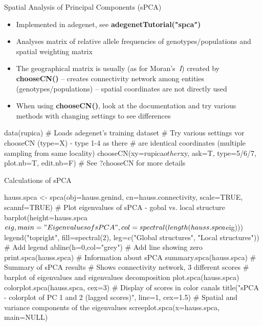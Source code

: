 \documentclass[compress, ucs, xelatex, 11pt, xcolor=svgnames,
  hyperref={
    bookmarks=true,
    unicode=true,
    colorlinks=true,
    pdftitle={Molecular data in R},
    plainpages=false,
    pdfauthor={Vojtech Zeisek},
    pdfsubject={Course about phylogeny and evolution in R},
    pdfcreator={XeLaTeX},
    pdfkeywords={R, evolution, phylogeny, molecular data},
    linkcolor=Tomato,
    anchorcolor=SaddleBrown,
    citecolor=Goldenrod,
    filecolor=DarkMagenta,
    menucolor=Sienna,
    urlcolor=DarkTurquoise,
    pdftex},
  url={hyphens, lowtilde} %
  ]{beamer}
\begin{document}
\begin{frame}[fragile]{Spatial Analysis of Principal Components (sPCA)}
\begin{itemize}
 \item Implemented in adegenet, see \textbf{adegenetTutorial("spca")}
 \item Analyses matrix of relative allele frequencies of genotypes/populations and spatial weighting matrix
 \item The geographical matrix is usually (as for Moran's~\textit{I}) created by \textbf{chooseCN()} -- creates connectivity network among entities (genotypes/populations) -- spatial coordinates are not directly used
 \item When using \textbf{chooseCN()}, look at the documentation and try various methods with changing settings to see differences
\end{itemize}
  \begin{spluscode}
    data(rupica) # Loads adegenet's training dataset
    # Try various settings vor chooseCN (type=X) - type 1-4 as there
    # are identical coordinates (multiple sampling from same locality)
    chooseCN(xy=rupica$other$xy, ask=T, type=5/6/7, plot.nb=T, edit.nb=F)
    # See ?chooseCN for more details
  \end{spluscode}
\end{frame}

\begin{frame}[fragile]{Calculations of sPCA}
  \begin{spluscode}
    hauss.spca <- spca(obj=hauss.genind, cn=hauss.connectivity,
      scale=TRUE, scannf=TRUE)
    # Plot eigenvalues of sPCA - gobal vs. local structure
    barplot(height=hauss.spca$eig, main="Eigenvalues of sPCA",
      col=spectral(length(hauss.spca$eig)))
    legend("topright", fill=spectral(2), leg=c("Global structures",
      "Local structures")) # Add legend
    abline(h=0,col="grey") # Add line showing zero
    print.spca(hauss.spca) # Information about sPCA
    summary.spca(hauss.spca) # Summary of sPCA results
    # Shows connectivity network, 3 different scores
    # barplot of eigenvalues and eigenvalues decomposition
    plot.spca(hauss.spca)
    colorplot.spca(hauss.spca, cex=3) # Display of scores in color canals
    title("sPCA - colorplot of PC 1 and 2 (lagged scores)", line=1, cex=1.5)
    # Spatial and variance components of the eigenvalues
    screeplot.spca(x=hauss.spca, main=NULL)
  \end{spluscode}
\end{frame}
\end{document}
